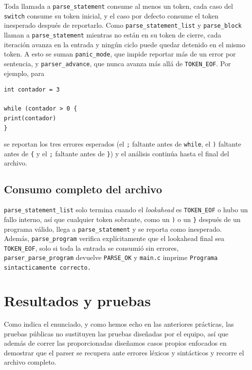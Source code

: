 \documentclass[12pt,letterpaper]{article}
\begin{document}
Toda llamada a \texttt{parse\_statement} consume al menos un token, cada caso del \texttt{switch} consume su
token inicial, y el caso por defecto consume el token inesperado después de reportarlo. Como
\texttt{parse\_statement\_list} y \texttt{parse\_block} llaman a \texttt{parse\_statement} mientras no están en
su token de cierre, cada iteración avanza en la entrada y ningún ciclo puede quedar detenido en el mismo
token. A esto se suman \texttt{panic\_mode}, que impide reportar más de un error por sentencia, y
\texttt{parser\_advance}, que nunca avanza más allá de \texttt{TOKEN\_EOF}. Por ejemplo, para

\begin{verbatim}
int contador = 3

while (contador > 0 {
print(contador)
}
\end{verbatim}

se reportan los tres errores esperados (el \texttt{;} faltante antes de \texttt{while}, el \texttt{)}
faltante antes de \texttt{\{} y el \texttt{;} faltante antes de \texttt{\}}) y el análisis continúa hasta el
final del archivo.

\subsection*{Consumo completo del archivo}

\texttt{parse\_statement\_list} solo termina cuando el \emph{lookahead} es \texttt{TOKEN\_EOF} o hubo un fallo
interno, así que cualquier token sobrante, como un \texttt{)} o un \texttt{\}} después de un programa
válido, llega a \texttt{parse\_statement} y se reporta como inesperado. Además, \texttt{parse\_program}
verifica explícitamente que el lookahead final sea \texttt{TOKEN\_EOF}, solo si toda la entrada se consumió
sin errores, \texttt{parser\_parse\_program} devuelve \texttt{PARSE\_OK} y \texttt{main.c} imprime
\texttt{Programa sintacticamente correcto.}


\bigskip


\section*{Resultados y pruebas}\label{sec:resultados}

Como indica el enunciado, y como hemos echo en las anteriores prácticas, las pruebas públicas no sustituyen las
pruebas diseñadas por el equipo, así que además de correr las proporcionadas diseñamos casos propios enfocados
en demostrar que el parser se recupera ante errores léxicos y sintácticos y recorre el archivo completo.\\
\end{document}
